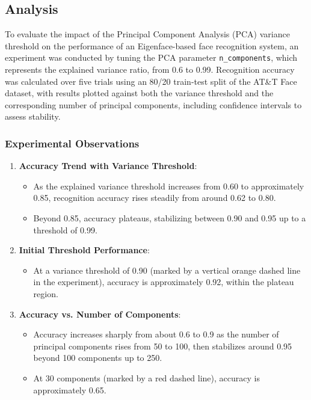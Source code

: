 \documentclass{article}
\begin{document}
	\subsection{Analysis}
	
	To evaluate the impact of the Principal Component Analysis (PCA) variance threshold on the performance of an Eigenface-based face recognition system, an experiment was conducted by tuning the PCA parameter \texttt{n\_components}, which represents the explained variance ratio, from 0.6 to 0.99. Recognition accuracy was calculated over five trials using an 80/20 train-test split of the AT\&T Face dataset, with results plotted against both the variance threshold and the corresponding number of principal components, including confidence intervals to assess stability.
	
	\subsubsection{Experimental Observations}
	\begin{enumerate}
		\item \textbf{Accuracy Trend with Variance Threshold}:
		\begin{itemize}
			\item As the explained variance threshold increases from 0.60 to approximately 0.85, recognition accuracy rises steadily from around 0.62 to 0.80.
			\item Beyond 0.85, accuracy plateaus, stabilizing between 0.90 and 0.95 up to a threshold of 0.99.
		\end{itemize}
		
		\item \textbf{Initial Threshold Performance}:
		\begin{itemize}
			\item At a variance threshold of 0.90 (marked by a vertical orange dashed line in the experiment), accuracy is approximately 0.92, within the plateau region.
		\end{itemize}
		
		\item \textbf{Accuracy vs. Number of Components}:
		\begin{itemize}
			\item Accuracy increases sharply from about 0.6 to 0.9 as the number of principal components rises from 50 to 100, then stabilizes around 0.95 beyond 100 components up to 250.
			\item At 30 components (marked by a red dashed line), accuracy is approximately 0.65.
		\end{itemize}
	\end{enumerate}
	
\end{document}
